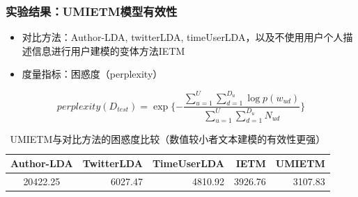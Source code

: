 \begin{frame}
\frametitle{\noindent 实验结果：UMIETM模型有效性}	
\begin{itemize}
	\item 对比方法：Author-LDA, twitterLDA, timeUserLDA，以及不使用用户个人描述信息进行用户建模的变体方法IETM
	\item 度量指标：困惑度（perplexity）
\end{itemize}
\begin{equation}
\label{eq:UMIETM_perplexity}
perplexity(D_{test})=\exp{\{-\frac{\sum_{u=1}^{U}\sum_{d=1}^{D_u}\log{p(w_{ud})}}{\sum_{u=1}^{U}\sum_{d=1}^{D_u}N_{ud}}\}}
\end{equation}


\begin{table}
\centering
\caption{UMIETM与对比方法的困惑度比较（数值较小者文本建模的有效性更强）}
\begin{tabular}{|c|r|r|r|r|} \hline
Author-LDA & TwitterLDA & TimeUserLDA & IETM & UMIETM\\ \hline
20422.25 & 6027.47 &  4810.92 & 3926.76 & 3107.83\\ \hline
\end{tabular}
\label{tab:heldoutPerplexity}
\end{table}
\end{frame}


